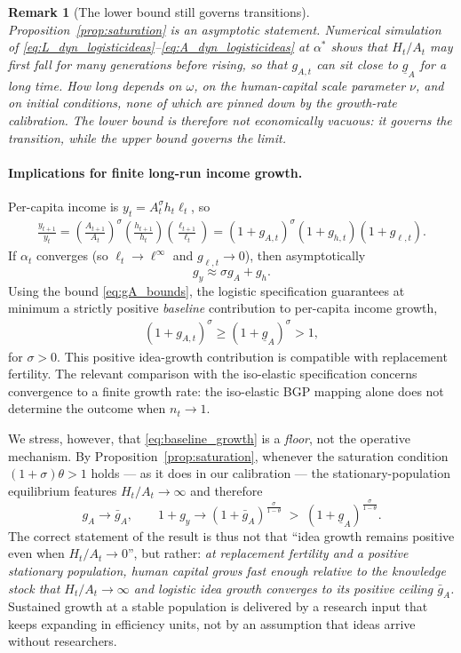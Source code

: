 \documentclass[11pt]{article}
\newtheorem{remark}{Remark}
\begin{document}
\begin{remark}[The lower bound still governs transitions]
\label{rem:transition}
Proposition~\ref{prop:saturation} is an asymptotic statement. Numerical simulation of
\eqref{eq:L_dyn_logisticideas}--\eqref{eq:A_dyn_logisticideas} at $\alpha^\ast$ shows that
$H_t/A_t$ may first fall for many generations before rising, so that $g_{A,t}$ can sit close to
$\underline g_A$ for a long time. How long depends on $\omega$, on the human-capital scale
parameter $\nu$, and on initial conditions, none of which are pinned down by the growth-rate
calibration. The lower bound is therefore not economically vacuous: it governs the transition,
while the upper bound governs the limit.
\end{remark}

\paragraph{Implications for finite long-run income growth.}
Per-capita income is $y_t=A_t^\sigma h_t\ell_t$, so
\begin{align}
\frac{y_{t+1}}{y_t}
=\left(\frac{A_{t+1}}{A_t}\right)^\sigma
\left(\frac{h_{t+1}}{h_t}\right)
\left(\frac{\ell_{t+1}}{\ell_t}\right)
=(1+g_{A,t})^\sigma(1+g_{h,t})(1+g_{\ell,t}).
\label{eq:gy_logisticideas_exact}
\end{align}
If $\alpha_t$ converges (so $\ell_t\to \ell^\infty$ and $g_{\ell,t}\to 0$), then asymptotically
\[
g_y \approx \sigma g_A + g_h.
\]
Using the bound \eqref{eq:gA_bounds}, the logistic specification guarantees at minimum a strictly
positive \emph{baseline} contribution to per-capita income growth,
\begin{align}
(1+g_{A,t})^\sigma \ge (1+\underline g_A)^\sigma > 1,
\label{eq:baseline_growth}
\end{align}
for $\sigma>0$. This positive idea-growth contribution is compatible with replacement fertility.
The relevant comparison with the iso-elastic specification concerns convergence to a finite
growth rate: the iso-elastic BGP mapping alone does not determine the outcome when $n_t\to1$.

We stress, however, that \eqref{eq:baseline_growth} is a \emph{floor}, not the operative mechanism.
By Proposition~\ref{prop:saturation}, whenever the saturation condition $(1+\sigma)\theta>1$ holds
--- as it does in our calibration --- the stationary-population equilibrium features
$H_t/A_t\to\infty$ and therefore
\[
g_A\to\bar g_A,
\qquad
1+g_y\to(1+\bar g_A)^{\frac{\sigma}{1-\theta}} \;>\;(1+\underline g_A)^{\frac{\sigma}{1-\theta}} .
\]
The correct statement of the result is thus not that ``idea growth remains positive even when
$H_t/A_t\to 0$'', but rather: \emph{at replacement fertility and a positive stationary population,
human capital grows fast enough relative to the knowledge stock that $H_t/A_t\to\infty$ and logistic
idea growth converges to its positive ceiling $\bar g_A$.} Sustained growth at a stable population
is delivered by a research input that keeps expanding in efficiency units, not by an assumption that
ideas arrive without researchers.
\end{document}
